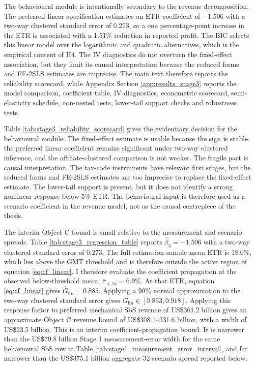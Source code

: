 \documentclass[11pt,a4paper]{article}
\begin{document}
The behavioural module is intentionally secondary to the revenue decomposition. The preferred linear specification estimates an ETR coefficient of $-1.506$ with a two-way clustered standard error of 0.273, so a one percentage-point increase in the ETR is associated with a 1.51\% reduction in reported profit. The BIC selects this linear model over the logarithmic and quadratic alternatives, which is the empirical content of H4. The IV diagnostics do not overturn the fixed-effect association, but they limit its causal interpretation because the reduced forms and FE-2SLS estimates are imprecise. The main text therefore reports the reliability scorecard, while Appendix Section \ref{app:results_stage3} reports the model comparison, coefficient table, IV diagnostics, econometric scorecard, semi-elasticity schedule, non-nested tests, lower-tail support checks and robustness tests.



Table \ref{tab:stage3_reliability_scorecard} gives the evidentiary decision for the behavioural module. The fixed-effect estimate is usable because the sign is stable, the preferred linear coefficient remains significant under two-way clustered inference, and the affiliate-clustered comparison is not weaker. The fragile part is causal interpretation. The tax-code instruments have relevant first stages, but the reduced forms and FE-2SLS estimates are too imprecise to replace the fixed-effect estimate. The lower-tail support is present, but it does not identify a strong nonlinear response below 5\% ETR. The behavioural input is therefore used as a scenario coefficient in the revenue model, not as the causal centrepiece of the thesis.

The interim Object C bound is small relative to the measurement and scenario spreads. Table \ref{tab:stage3_regression_table} reports $\hat{\beta}_3=-1.506$ with a two-way clustered standard error of 0.273. The full estimation-sample mean ETR is 18.0\%, which lies above the GMT threshold and is therefore outside the active region of equation \eqref{eq:cf_linear}. I therefore evaluate the coefficient propagation at the observed below-threshold mean, $\bar{\tau}_{<15}=6.9\%$. At that ETR, equation \eqref{eq:cf_linear} gives $\hat{G}_{\text{lin}}=0.885$. Applying a 90\% normal approximation to the two-way clustered standard error gives $G_{\text{lin}}\in[0.853,0.918]$. Applying this response factor to preferred mechanical SbS revenue of US\$361.2 billion gives an approximate Object C revenue bound of US\$308.1--331.6 billion, with a width of US\$23.5 billion. This is an interim coefficient-propagation bound. It is narrower than the US\$79.8 billion Stage 1 measurement-error width for the same behavioural SbS row in Table \ref{tab:stage1_measurement_error_interval}, and far narrower than the US\$375.1 billion aggregate 32-scenario spread reported below.
\end{document}
